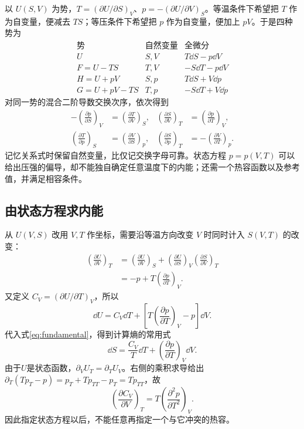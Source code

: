 以 $U(S,V)$ 为势，$T=(\partial U/\partial S)_V$、$p=-(\partial U/\partial V)_S$。等温条件下希望把 $T$ 作为自变量，便减去 $TS$；等压条件下希望把 $p$ 作为自变量，便加上 $pV$。于是四种势为
\[
 \begin{array}{c|c|c}
 \text{势}&\text{自然变量}&\text{全微分}\\\hline
 U&S,V&T\dd S-p\dd V\\
 F=U-TS&T,V&-S\dd T-p\dd V\\
 H=U+pV&S,p&T\dd S+V\dd p\\
 G=U+pV-TS&T,p&-S\dd T+V\dd p
 \end{array}
\]
对同一势的混合二阶导数交换次序，依次得到
\begin{align}
 -\left(\frac{\partial p}{\partial S}\right)_V
 &=\left(\frac{\partial T}{\partial V}\right)_S,&
 \left(\frac{\partial S}{\partial V}\right)_T
 &=\left(\frac{\partial p}{\partial T}\right)_V,\\
 \left(\frac{\partial T}{\partial p}\right)_S
 &=\left(\frac{\partial V}{\partial S}\right)_p,&
 \left(\frac{\partial S}{\partial p}\right)_T
 &=-\left(\frac{\partial V}{\partial T}\right)_p.
\end{align}
记忆关系式时保留自然变量，比仅记交换字母可靠。状态方程 $p=p(V,T)$ 可以给出压强的偏导，却不能独自确定任意温度下的内能；还需一个热容函数以及参考值，并满足相容条件。

\subsection{由状态方程求内能}
\label{th:energyidentity}
从 $U(V,S)$ 改用 $V,T$ 作坐标，需要沿等温方向改变 $V$ 时同时计入 $S(V,T)$ 的改变：
\begin{align}
 \left(\frac{\partial U}{\partial V}\right)_T
 &=\left(\frac{\partial U}{\partial V}\right)_S
 +\left(\frac{\partial U}{\partial S}\right)_V
 \left(\frac{\partial S}{\partial V}\right)_T\\
 &=-p+T\left(\frac{\partial p}{\partial T}\right)_V.
\end{align}
又定义 $C_V=(\partial U/\partial T)_V$，所以
\begin{equation}\label{eq:duvt}
 \dd U=C_V\dd T+\left[T\left(\frac{\partial p}{\partial T}\right)_V-p\right]\dd V.
\end{equation}
代入式\eqref{eq:fundamental}，得到计算熵的常用式
\begin{equation}\label{eq:dsvt}
 \dd S=\frac{C_V}{T}\dd T+
 \left(\frac{\partial p}{\partial T}\right)_V\dd V.
\end{equation}
由于$U$是状态函数，$\partial_VU_T=\partial_TU_V$。右侧的乘积求导给出$\partial_T(Tp_T-p)=p_T+Tp_{TT}-p_T=Tp_{TT}$，故
\begin{equation}\label{eq:cvcompat}
 \left(\frac{\partial C_V}{\partial V}\right)_T
 =T\left(\frac{\partial^2p}{\partial T^2}\right)_V.
\end{equation}
因此指定状态方程以后，不能任意再指定一个与它冲突的热容。

